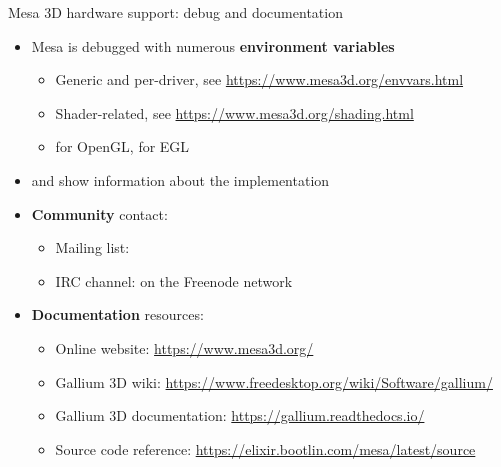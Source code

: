 \begin{frame}[fragile]{Mesa 3D hardware support: debug and documentation}
  \begin{itemize}
  \item Mesa is debugged with numerous \textbf{environment variables}
    \begin{itemize}
    \item Generic and per-driver, see \url{https://www.mesa3d.org/envvars.html}
    \item Shader-related, see \url{https://www.mesa3d.org/shading.html}
    \item {} for OpenGL,  for EGL
    \end{itemize}
  \item {} and  show information about the implementation
  \item \textbf{Community} contact:
    \begin{itemize}
    \item Mailing list: 
    \item IRC channel:  on the Freenode network
    \end{itemize}
  \item \textbf{Documentation} resources:
    \begin{itemize}
    \item Online website: \url{https://www.mesa3d.org/}
    \item Gallium 3D wiki: \url{https://www.freedesktop.org/wiki/Software/gallium/}
    \item Gallium 3D documentation: \url{https://gallium.readthedocs.io/}
    \item Source code reference: \url{https://elixir.bootlin.com/mesa/latest/source}
    \end{itemize}
  \end{itemize}
\end{frame}

